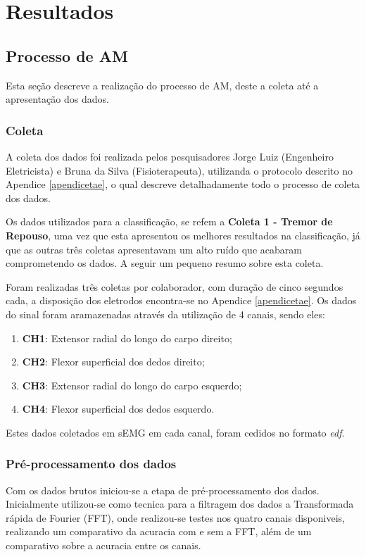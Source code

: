 \chapter{Resultados}
\label{ch:Resultados}
\section{Processo de AM}
Esta seção descreve a realização do processo de AM, deste a coleta até a apresentação dos dados.
\subsection{Coleta}
A coleta dos dados foi realizada pelos pesquisadores Jorge Luiz (Engenheiro Eletricista) e Bruna da Silva (Fisioterapeuta), utilizanda o protocolo descrito no Apendice \ref{apendicetae}, o qual descreve detalhadamente todo o processo de coleta dos dados.

Os dados utilizados para a classificação, se refem a \textbf{Coleta 1 - Tremor de Repouso}, uma vez que esta apresentou os melhores resultados na classificação, já que as outras três coletas apresentavam um alto ruído que acabaram comprometendo os dados. A seguir um pequeno resumo sobre esta coleta.

Foram realizadas três coletas por colaborador, com duração de cinco segundos cada, a disposição dos eletrodos encontra-se no Apendice \ref{apendicetae}. Os dados do sinal foram aramazenadas através da utilização de 4 canais, sendo eles:
\begin{enumerate}
    \item \textbf{CH1}: Extensor radial do longo do carpo direito;
    \item \textbf{CH2}: Flexor superficial dos dedos direito;
    \item \textbf{CH3}: Extensor radial do longo do carpo esquerdo;
    \item \textbf{CH4}: Flexor superficial dos dedos esquerdo.
\end{enumerate}

Estes dados coletados em sEMG em cada canal, foram cedidos no formato \textit{edf}.

\subsection{Pré-processamento dos dados}
Com os dados brutos iniciou-se a etapa de pré-processamento dos dados. Inicialmente utilizou-se como tecnica para a filtragem dos dados a Transformada rápida de Fourier (FFT), onde realizou-se testes nos quatro canais disponiveis, realizando um comparativo da acuracia com e sem a FFT, além de um comparativo sobre a acuracia entre os canais. 

